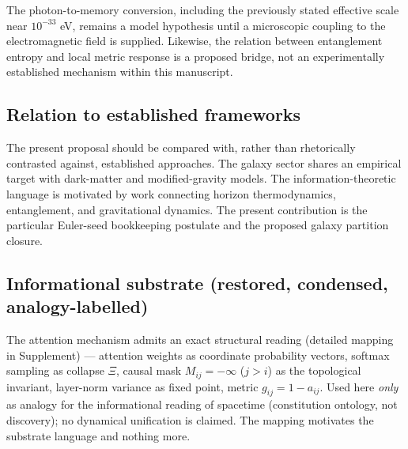 \documentclass[twocolumn]{aastex631}
\begin{document}
The photon-to-memory conversion, including the previously stated effective scale near $10^{-33}$ eV, remains a model hypothesis until a microscopic coupling to the electromagnetic field is supplied. Likewise, the relation between entanglement entropy and local metric response is a proposed bridge, not an experimentally established mechanism within this manuscript.

\subsection{Relation to established frameworks}
The present proposal should be compared with, rather than rhetorically contrasted against, established approaches. The galaxy sector shares an empirical target with dark-matter and modified-gravity models. The information-theoretic language is motivated by work connecting horizon thermodynamics, entanglement, and gravitational dynamics. The present contribution is the particular Euler-seed bookkeeping postulate and the proposed galaxy partition closure.

\subsection{Informational substrate (restored, condensed, analogy-labelled)}
The attention mechanism admits an exact structural reading (detailed mapping in Supplement) --- attention weights as coordinate probability vectors, softmax sampling as collapse $\Xi$, causal mask $M_{ij}=-\infty$ ($j>i$) as the topological invariant, layer-norm variance as fixed point, metric $g_{ij}=1-a_{ij}$. Used here \emph{only} as analogy for the informational reading of spacetime (constitution ontology, not discovery); no dynamical unification is claimed. The mapping motivates the substrate language and nothing more.
\end{document}

